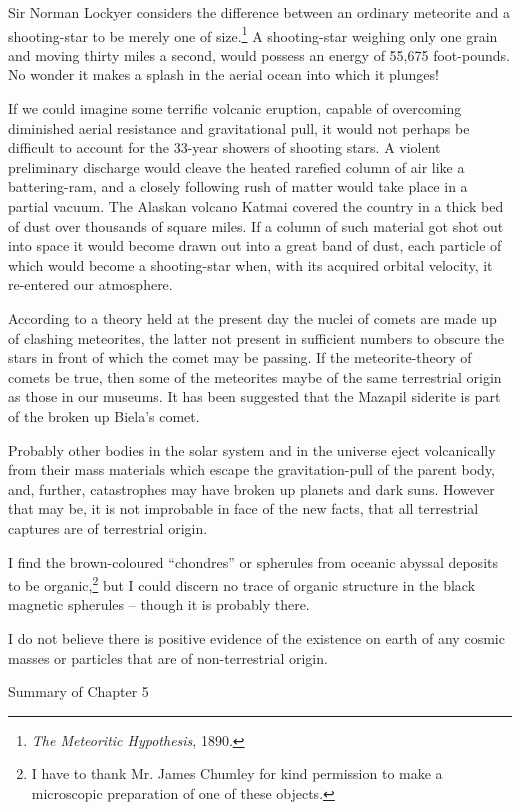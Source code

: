 \documentclass[a4paper, 12pt, oneside]{article}
\begin{document}
Sir Norman Lockyer considers the difference between an ordinary meteorite and a shooting-star to be merely one of size.\footnote{\emph{The Meteoritic Hypothesis}, 1890.} A shooting-star weighing only one grain and moving thirty miles a second, would possess an energy of 55,675 foot-pounds. No wonder it makes a splash in the aerial ocean into which it plunges!

If we could imagine some terrific volcanic eruption, capable of overcoming diminished aerial resistance and gravitational pull, it would not perhaps be difficult to account for the 33-year showers of shooting stars. A violent preliminary discharge would cleave the heated rarefied column of air like a battering-ram, and a closely following rush of matter would take place in a partial vacuum. The Alaskan volcano Katmai covered the country in a thick bed of dust over thousands of square miles. If a column of such material got shot out into space it would become drawn out into a great band of dust, each particle of which would become a shooting-star when, with its acquired orbital velocity, it re-entered our atmosphere.

According to a theory held at the present day the nuclei of comets are made up of clashing meteorites, the latter not present in sufficient numbers to obscure the stars in front of which the comet may be passing. If the meteorite-theory of comets be true, then some of the meteorites maybe of the same terrestrial origin as those in our museums. It has been suggested that the Mazapil siderite is part of the broken up Biela's comet.

Probably other bodies in the solar system and in the universe eject volcanically from their mass materials which escape the gravitation-pull of the parent body, and, further, catastrophes may have broken up planets and dark suns. However that may be, it is not improbable in face of the new facts, that all terrestrial captures are of terrestrial origin.

I find the brown-coloured ``chondres'' or spherules from oceanic abyssal deposits to be organic,\footnote{I have to thank Mr. James Chumley for kind permission to make a microscopic preparation of one of these objects.} but I could discern no trace of organic structure in the black magnetic spherules -- though it is probably there.

I do not believe there is positive evidence of the existence on earth of any cosmic masses or particles that are of non-terrestrial origin.

Summary of Chapter 5
\end{document}
